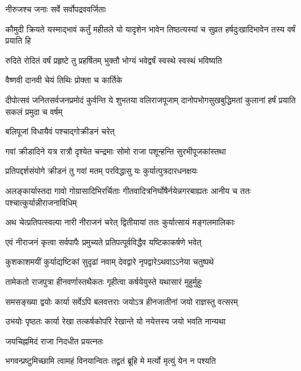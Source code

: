 \onelineshloka
{नीरुजश्च जनाः सर्वे सर्वोपद्रववर्जिताः} %

\threelineshloka
{कौमुदी क्रियते यस्माद्भावं कर्तुं महीतले}
{यो यादृशेन भावेन तिष्ठत्यस्यां च सुव्रत}
{हर्षदुःखादिभावेन तस्य वर्षं प्रयाति हि} %

\twolineshloka
{रुदिते रोदितं वर्षं प्रहृष्टे तु प्रहर्षितम्}
{भुक्तौ भोग्यं भवेद्वर्षं स्वस्थे स्वस्थं भविष्यति} %


\onelineshloka
{वैष्णवी दानवी चेयं तिथिः प्रोक्ता च कार्तिके} %

\twolineshloka
{दीपोत्सवं जनितसर्वजनप्रमोदं कुर्वन्ति ये शुभतया वलिराजपूजाम्}
{दानोपभोगसुखबुद्धिमतां कुलानां हर्षं प्रयाति सकलं प्रमुदा च वर्षम्} %


\onelineshloka
{बलिपूजां विधायैवं पश्चाद्गोक्रीडनं चरेत्} %

\twolineshloka
{गवां क्रीडादिने यत्र रात्रौ दृश्येत चन्द्रमाः}
{सोमो राजा पशून्हन्ति सुरभीपूजकांस्तथा} %

\twolineshloka
{प्रतिपद्दर्शसंयोगे क्रीडनं तु गवां मतम्}
{परविद्धासु यः कुर्यात्पुत्रदारधनक्षयः} %

\threelineshloka
{अलङ्कार्यास्तदा गावो गोग्रासादिभिरर्चिताः}
{गीतवादित्रनिर्घोषैर्नयेन्नगरबाह्यतः}
{आनीय च ततः पश्चात्कुर्यान्नीराजनाविधिम्} %

\twolineshloka
{अथ चेत्प्रतिपत्स्वल्पा नारी नीराजनं चरेत्}
{द्वितीयायां ततः कुर्यात्सायं मङ्गलमालिकाः} %

\twolineshloka
{एवं नीराजनं कृत्वा सर्वपापैः प्रमुच्यते}
{प्रतिपत्पूर्वविद्धैव यष्टिकाकर्षणे भवेत्} %

\twolineshloka
{कुशकाशमयीं कुर्याद्यष्टिकां सुदृढां नवाम्}
{देवद्वारे नृपद्वारेऽथवाऽऽनेया चतुष्पथे} %

\twolineshloka
{तामेकतो राजपुत्रा हीनवर्णास्तथैकतः}
{गृहीत्वा कर्षयेयुस्ते यथासारं मुहुर्मुहुः} %

\twolineshloka
{समसङ्ख्या द्वयोः कार्या सर्वेऽपि बलवत्तराः}
{जयोऽत्र हीनजातीनां जयो राज्ञस्तु वत्सरम्} %

\twolineshloka
{उभयोः पृष्ठतः कार्या रेखा तत्कर्षकोपरि}
{रेखान्ते यो नयेत्तस्य जयो भवति नान्यथा} %


\onelineshloka
{जयचिह्नमिदं राजा निदधीत प्रयत्नतः} %





\twolineshloka
{भगवन्प्रष्टुमिच्छामि त्वामहं विनयान्वितः}
{तद्व्रतं ब्रूहि मे मर्त्यो मृत्युं येन न पश्यति} %


